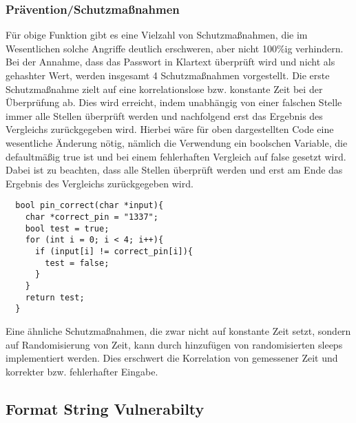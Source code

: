 \documentclass[a4paper,
DIV=13,
12pt,
BCOR=10mm,
department=FakIM,
oneside,
parskip=half,
automark,
listof=totocnumbered,
bibliography=totocnumbered,
acronym=totocnumbered
] {OTHRartcl}
\begin{document}
\subsubsection{Prävention/Schutzmaßnahmen}
Für obige Funktion gibt es eine Vielzahl von Schutzmaßnahmen, die im Wesentlichen solche Angriffe deutlich erschweren, aber nicht 100\%ig verhindern.
Bei der Annahme, dass das Passwort in Klartext überprüft wird und nicht als gehashter Wert, werden insgesamt 4 Schutzmaßnahmen vorgestellt.
Die erste Schutzmaßnahme zielt auf eine korrelationslose bzw. konstante Zeit bei der Überprüfung ab. Dies wird erreicht, indem unabhängig
von einer falschen Stelle immer alle Stellen überprüft werden und nachfolgend erst das Ergebnis des Vergleichs zurückgegeben wird.
Hierbei wäre für oben dargestellten Code eine wesentliche Änderung nötig, nämlich die Verwendung ein boolschen Variable,
die defaultmäßig true ist und bei einem fehlerhaften Vergleich auf false gesetzt wird. Dabei ist zu beachten, dass
alle Stellen überprüft werden und erst am Ende das Ergebnis des Vergleichs zurückgegeben wird.
\begin{verbatim}
  bool pin_correct(char *input){
    char *correct_pin = "1337";
    bool test = true;
    for (int i = 0; i < 4; i++){
      if (input[i] != correct_pin[i]){
        test = false;
      }
    }
    return test;
  }
\end{verbatim}

Eine ähnliche Schutzmaßnahmen, die zwar nicht auf konstante Zeit setzt, sondern auf Randomisierung von Zeit, kann durch hinzufügen von
randomisierten sleeps implementiert werden. Dies erschwert die Korrelation von gemessener Zeit und korrekter bzw. fehlerhafter Eingabe.



\subsection{Format String Vulnerabilty}
\end{document}
